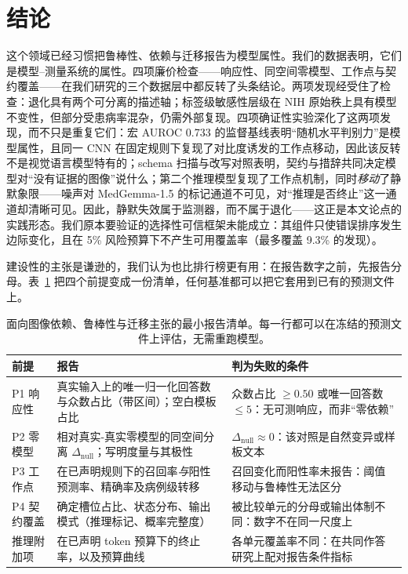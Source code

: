 \section*{结论}
\label{sec:conclusion}

这个领域已经习惯把鲁棒性、依赖与迁移报告为模型属性。我们的数据表明，它们是模型--测量系统的属性。四项廉价检查——响应性、同空间零模型、工作点与契约覆盖——在我们研究的三个数据层中都反转了头条结论。两项发现经受住了检查：退化具有两个可分离的描述轴；标签级敏感性层级在 NIH 原始秩上具有模型不变性，但部分受患病率混杂，仍需外部复现。四项确证性实验深化了这两项发现，而不只是重复它们：宏 AUROC 0.733 的监督基线表明``随机水平判别力''是模型属性，且同一 CNN 在固定规则下复现了对比度诱发的工作点移动，因此该反转不是视觉语言模型特有的；schema 扫描与改写对照表明，契约与措辞共同决定模型对``没有证据的图像''说什么；第二个推理模型复现了工作点机制，同时\emph{移动}了静默象限——噪声对 MedGemma-1.5 的标记通道不可见，对``推理是否终止''这一通道却清晰可见。因此，静默失效属于监测器，而不属于退化——这正是本文论点的实践形态。我们原本要验证的选择性可信框架未能成立：其组件只使错误排序发生边际变化，且在 5\% 风险预算下不产生可用覆盖率（最多覆盖 9.3\% 的发现）。

建设性的主张是谦逊的，我们认为也比排行榜更有用：在报告数字之前，先报告分母。表~\ref{tab:checklist} 把四个前提变成一份清单，任何基准都可以把它套用到已有的预测文件上。

\begin{table}[h]
\centering
\small
\caption{面向图像依赖、鲁棒性与迁移主张的最小报告清单。每一行都可以在冻结的预测文件上评估，无需重跑模型。}
\label{tab:checklist}
\begin{tabular}{p{}p{}p{}}
\toprule
前提 & 报告 & 判为失败的条件 \\
\midrule
P1 响应性 & 真实输入上的唯一归一化回答数与众数占比（带区间）；空白模板占比 & 众数占比 $\ge 0.50$ 或唯一回答数 $\le 5$：无可测响应，而非``零依赖'' \\
P2 零模型 & 相对真实-真实零模型的同空间分离 $\Delta_{\text{null}}$；写明度量与其极性 & $\Delta_{\text{null}} \approx 0$：该对照是自然变异或样板文本 \\
P3 工作点 & 在已声明规则下的召回率\emph{与}阳性预测率、精确率及病例级转移 & 召回变化而阳性率未报告：阈值移动与鲁棒性无法区分 \\
P4 契约覆盖 & 确定槽位占比、状态分布、输出模式（推理标记、概率完整度） & 被比较单元的分母或输出体制不同：数字不在同一尺度上 \\
\midrule
推理附加项 & 在已声明 token 预算下的终止率，以及预算曲线 & 各单元覆盖率不同：在共同作答研究上配对报告条件指标 \\
\bottomrule
\end{tabular}
\end{table}

